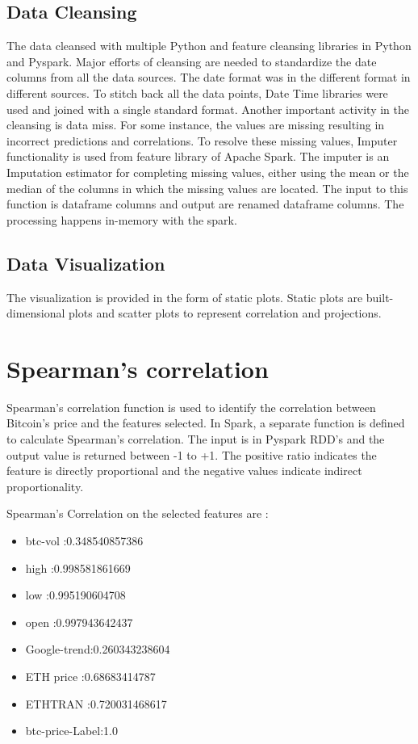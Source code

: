 \documentclass[sigconf]{acmart}
\begin{document}
\subsection{Data Cleansing}
The data cleansed with multiple Python and feature cleansing libraries in Python and Pyspark. Major efforts of cleansing are needed to standardize the date columns from all the data sources. The date format was in the different format in different sources. To stitch back all the data points, Date Time libraries were used and joined with a single standard format. Another important activity in the cleansing is data miss. For some instance, the values are missing resulting in incorrect predictions and correlations. To resolve these missing values, Imputer \cite{imputer:online} functionality is used from feature library of Apache Spark. The imputer is an Imputation estimator for completing missing values, either using the mean or the median of the columns in which the missing values are located. The input to this function is dataframe columns and output are renamed dataframe columns. The processing happens in-memory with the spark.

\subsection{Data Visualization}
The visualization is provided in the form of static plots. Static plots are built-dimensional plots and scatter plots to represent correlation and projections.

\section{Spearman's correlation}
Spearman's correlation function is used to identify the correlation between Bitcoin's price and the features selected. In Spark, a separate function is defined to calculate Spearman's correlation. The input is in Pyspark RDD's and the output value is returned between -1 to +1. The positive ratio indicates the feature is directly proportional and the negative values indicate indirect proportionality.

Spearman's Correlation on the selected features are :

\begin{itemize}
\item btc-vol     :0.348540857386 
\item high        :0.998581861669 
\item low         :0.995190604708 
\item open        :0.997943642437  
\item Google-trend:0.260343238604  
\item ETH price   :0.68683414787  
\item ETHTRAN     :0.720031468617
\item btc-price-Label:1.0 
\end{itemize}
\end{document}
